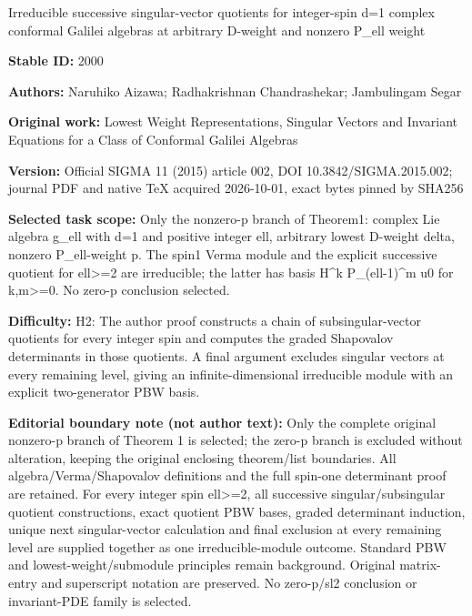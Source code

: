\documentclass[11pt]{article}
\numberwithin{equation}{section}
\begin{document}
\begin{center}\Large Irreducible successive singular-vector quotients for integer-spin d=\allowbreak{}1 complex conformal Galilei algebras at arbitrary D-weight and nonzero P\_ell weight\end{center}
\noindent\textbf{Stable ID:} 2000\par
\noindent\textbf{Authors:} Naruhiko Aizawa; Radhakrishnan Chandrashekar; Jambulingam Segar\par
\noindent\textbf{Original work:} Lowest Weight Representations, Singular Vectors and Invariant Equations for a Class of Conformal Galilei Algebras\par
\noindent\textbf{Version:} Official SIGMA 11 (2015) article 002, DOI 10.3842/SIGMA.2015.002; journal PDF and native TeX acquired 2026-10-01, exact bytes pinned by SHA256\par
\noindent\textbf{Selected task scope:} Only the nonzero-p branch of Theorem1: complex Lie algebra g\_ell with d=\allowbreak{}1 and positive integer ell, arbitrary lowest D-weight delta, nonzero P\_ell-weight p. The spin1 Verma module and the explicit successive quotient for ell>=\allowbreak{}2 are irreducible; the latter has basis H\textasciicircum{}k P\_(ell-1)\textasciicircum{}m u0 for k,m>=\allowbreak{}0. No zero-p conclusion selected.\par
\noindent\textbf{Difficulty:} H2: The author proof constructs a chain of subsingular-vector quotients for every integer spin and computes the graded Shapovalov determinants in those quotients. A final argument excludes singular vectors at every remaining level, giving an infinite-dimensional irreducible module with an explicit two-generator PBW basis.\par
\noindent\textbf{Editorial boundary note (not author text):} Only the complete original nonzero-p branch of Theorem 1 is selected; the zero-p branch is excluded without alteration, keeping the original enclosing theorem/list boundaries. All algebra/Verma/Shapovalov definitions and the full spin-one determinant proof are retained. For every integer spin ell>=\allowbreak{}2, all successive singular/subsingular quotient constructions, exact quotient PBW bases, graded determinant induction, unique next singular-vector calculation and final exclusion at every remaining level are supplied together as one irreducible-module outcome. Standard PBW and lowest-weight/submodule principles remain background. Original matrix-entry and superscript notation are preserved. No zero-p/sl2 conclusion or invariant-PDE family is selected.\par
\end{document}
